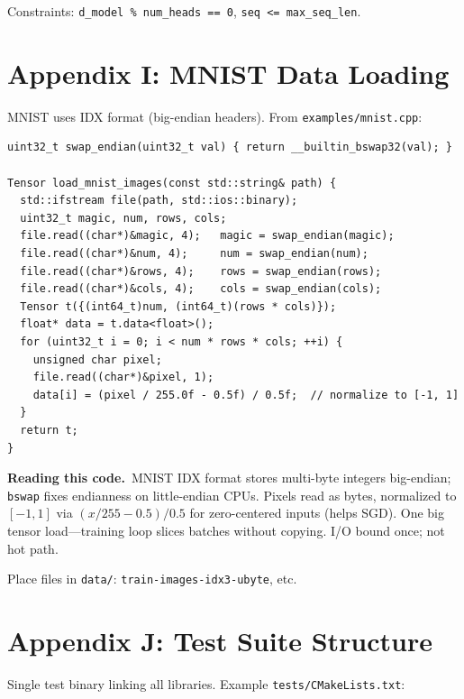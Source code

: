 \documentclass[11pt,a4paper]{article}
\newcommand{\explain}{\par\smallskip\noindent}
\newcommand{\exhead}{\textbf{Reading this code.}\ }
\begin{document}
Constraints: \texttt{d\_model \% num\_heads == 0}, \texttt{seq <= max\_seq\_len}.

\section{Appendix I: MNIST Data Loading}
\label{app:mnist}

MNIST uses IDX format (big-endian headers). From \texttt{examples/mnist.cpp}:

\begin{lstlisting}[style=cpp]
uint32_t swap_endian(uint32_t val) { return __builtin_bswap32(val); }

Tensor load_mnist_images(const std::string& path) {
  std::ifstream file(path, std::ios::binary);
  uint32_t magic, num, rows, cols;
  file.read((char*)&magic, 4);   magic = swap_endian(magic);
  file.read((char*)&num, 4);     num = swap_endian(num);
  file.read((char*)&rows, 4);    rows = swap_endian(rows);
  file.read((char*)&cols, 4);    cols = swap_endian(cols);
  Tensor t({(int64_t)num, (int64_t)(rows * cols)});
  float* data = t.data<float>();
  for (uint32_t i = 0; i < num * rows * cols; ++i) {
    unsigned char pixel;
    file.read((char*)&pixel, 1);
    data[i] = (pixel / 255.0f - 0.5f) / 0.5f;  // normalize to [-1, 1]
  }
  return t;
}
\end{lstlisting}
\explain\exhead MNIST IDX format stores multi-byte integers big-endian; \texttt{bswap} fixes
endianness on little-endian CPUs. Pixels read as bytes, normalized to $[-1,1]$ via
$(x/255 - 0.5)/0.5$ for zero-centered inputs (helps SGD). One big tensor load---training loop
slices batches without copying. I/O bound once; not hot path.

Place files in \texttt{data/}: \texttt{train-images-idx3-ubyte}, etc.

\section{Appendix J: Test Suite Structure}
\label{app:tests}

Single test binary linking all libraries. Example \texttt{tests/CMakeLists.txt}:
\end{document}
